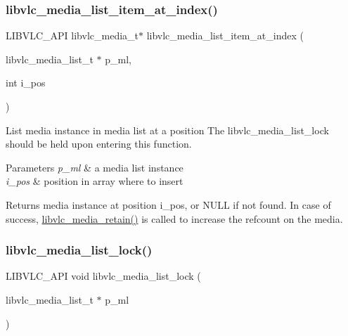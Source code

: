 \subsubsection{\texorpdfstring{libvlc\+\_\+media\+\_\+list\+\_\+item\+\_\+at\+\_\+index()}{libvlc\_media\_list\_item\_at\_index()}}
{\footnotesize\ttfamily L\+I\+B\+V\+L\+C\+\_\+\+A\+PI libvlc\+\_\+media\+\_\+t$\ast$ libvlc\+\_\+media\+\_\+list\+\_\+item\+\_\+at\+\_\+index (\begin{DoxyParamCaption}\item[{libvlc\+\_\+media\+\_\+list\+\_\+t $\ast$}]{p\+\_\+ml,  }\item[{int}]{i\+\_\+pos }\end{DoxyParamCaption})}

List media instance in media list at a position The libvlc\+\_\+media\+\_\+list\+\_\+lock should be held upon entering this function.


\begin{DoxyParams}{Parameters}
{\em p\+\_\+ml} & a media list instance \\
\hline
{\em i\+\_\+pos} & position in array where to insert \\
\hline
\end{DoxyParams}
\begin{DoxyReturn}{Returns}
media instance at position i\+\_\+pos, or N\+U\+LL if not found. In case of success, \hyperlink{group__libvlc__media_gaf4be74c918bc34ea4182e8028ea5f0ba}{libvlc\+\_\+media\+\_\+retain()} is called to increase the refcount on the media. 
\end{DoxyReturn}
\mbox{\label{group__libvlc__media__list_ga908ca009b4ebecbccdeb5650c72cd7a9}} 
\subsubsection{\texorpdfstring{libvlc\+\_\+media\+\_\+list\+\_\+lock()}{libvlc\_media\_list\_lock()}}
{\footnotesize\ttfamily L\+I\+B\+V\+L\+C\+\_\+\+A\+PI void libvlc\+\_\+media\+\_\+list\+\_\+lock (\begin{DoxyParamCaption}\item[{libvlc\+\_\+media\+\_\+list\+\_\+t $\ast$}]{p\+\_\+ml }\end{DoxyParamCaption})}

